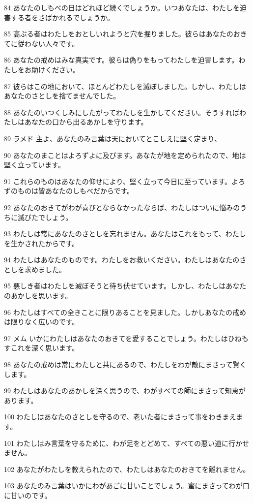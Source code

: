 \par 84 あなたのしもべの日はどれほど続くでしょうか。いつあなたは、わたしを迫害する者をさばかれるでしょうか。
\par 85 高ぶる者はわたしをおとしいれようと穴を掘りました。彼らはあなたのおきてに従わない人々です。
\par 86 あなたの戒めはみな真実です。彼らは偽りをもってわたしを迫害します。わたしをお助けください。
\par 87 彼らはこの地において、ほとんどわたしを滅ぼしました。しかし、わたしはあなたのさとしを捨てませんでした。
\par 88 あなたのいつくしみにしたがってわたしを生かしてください。そうすればわたしはあなたの口から出るあかしを守ります。
\par 89 ラメド 主よ、あなたのみ言葉は天においてとこしえに堅く定まり、
\par 90 あなたのまことはよろずよに及びます。あなたが地を定められたので、地は堅く立っています。
\par 91 これらのものはあなたの仰せにより、堅く立って今日に至っています。よろずのものは皆あなたのしもべだからです。
\par 92 あなたのおきてがわが喜びとならなかったならば、わたしはついに悩みのうちに滅びたでしょう。
\par 93 わたしは常にあなたのさとしを忘れません。あなたはこれをもって、わたしを生かされたからです。
\par 94 わたしはあなたのものです。わたしをお救いください。わたしはあなたのさとしを求めました。
\par 95 悪しき者はわたしを滅ぼそうと待ち伏せています。しかし、わたしはあなたのあかしを思います。
\par 96 わたしはすべての全きことに限りあることを見ました。しかしあなたの戒めは限りなく広いのです。
\par 97 メム いかにわたしはあなたのおきてを愛することでしょう。わたしはひねもすこれを深く思います。
\par 98 あなたの戒めは常にわたしと共にあるので、わたしをわが敵にまさって賢くします。
\par 99 わたしはあなたのあかしを深く思うので、わがすべての師にまさって知恵があります。
\par 100 わたしはあなたのさとしを守るので、老いた者にまさって事をわきまえます。
\par 101 わたしはみ言葉を守るために、わが足をとどめて、すべての悪い道に行かせません。
\par 102 あなたがわたしを教えられたので、わたしはあなたのおきてを離れません。
\par 103 あなたのみ言葉はいかにわがあごに甘いことでしょう。蜜にまさってわが口に甘いのです。
